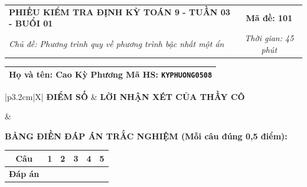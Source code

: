 \documentclass[12pt,a4paper]{article}
\begin{document}
\newpage



\noindent
\begin{tabularx}{\linewidth}{|X|c|}
\hline
\textbf{PHIẾU KIỂM TRA ĐỊNH KỲ TOÁN 9 - TUẦN 03 - BUỔI 01} & \textbf{Mã đề: 101} \\
\textit{Chủ đề: Phương trình quy về phương trình bậc nhất một ẩn} & \textit{Thời gian: 45 phút} \\
\hline
\end{tabularx}

\vspace{1mm}

\noindent
\begin{tabularx}{\linewidth}{|X|}
\hline
\rule[-2mm]{0pt}{7.5mm}\textbf{Họ và tên:} \textbf{\large Cao Kỳ Phương} \hfill \textbf{Mã HS:} \texttt{KYPHUONG0508} \quad \\
\hline
\end{tabularx}

\vspace{1mm}

\noindent
\begin{tabularx}{\linewidth}{|p{3.2cm}|X|}
\hline
\centering\textbf{ĐIỂM SỐ} & \centering\textbf{LỜI NHẬN XÉT CỦA THẦY CÔ} \tabularnewline
\hline
\rule{0pt}{1.3cm} & \tabularnewline
\hline
\end{tabularx}

\vspace{1.2mm}

\noindent\textbf{BẢNG ĐIỀN ĐÁP ÁN TRẮC NGHIỆM (Mỗi câu đúng 0,5 điểm):}
\vspace{0.8mm}

\noindent
\renewcommand{\arraystretch}{1.35}
\begin{tabularx}{\linewidth}{|c|*{5}{>{\centering\arraybackslash}X|}}
\hline
\textbf{Câu} & \textbf{1} & \textbf{2} & \textbf{3} & \textbf{4} & \textbf{5} \\
\hline
\textbf{Đáp án} & & & & & \\
\hline
\end{tabularx}
\renewcommand{\arraystretch}{1.0}

\vspace{1.5mm}
\end{document}
